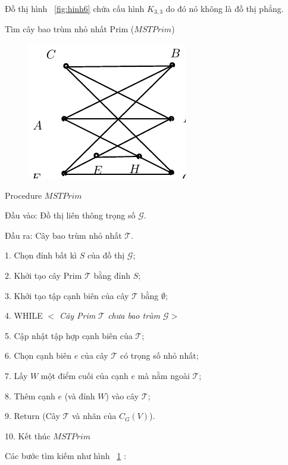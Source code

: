 \documentclass[11pt]{article}
\begin{document}
\begin{shortanswer}[title={\relax}, rearrange=no]
\begin{question}
\begin{answer}
Đồ thị hình ~\ref{fig:hinh6} chứa cấu hình $K_{3,3}$ do đó nó không là đồ thị phẳng.
\end{answer}
\end{question}

\begin{question}%
\begin{answer}
Tìm cây bao trùm nhỏ nhất Prim ($MSTPrim$)

\begin{figure}[!ht]
\centering
\includegraphics[scale =1]{dothiphang2}
\caption{}\label{fig:hinh8}
\end{figure}

Procedure $MSTPrim$

Đầu vào: Đồ thị liên thông trọng số $\mathcal G$. 

Đầu ra:  Cây bao trùm nhỏ nhất $\mathcal T$.

 1. Chọn đỉnh bất kì $S$ của đồ thị $\mathcal G$;

 2. Khởi tạo  cây Prim  $\mathcal T$ bằng đỉnh  $S$;

 3.  Khởi tạo tập cạnh biên của cây $\mathcal T$ bằng  $\emptyset$;

 4. WHILE {{\it $<$ Cây Prim $\mathcal T$ chưa bao trùm  $\mathcal G>$}}

5.  Cập nhật tập hợp cạnh biên của $\mathcal T$;

6.  Chọn cạnh biên $e$ của cây $\mathcal  T$ có trọng số nhỏ nhất;

7.  Lấy $W$ một điểm cuối của cạnh $e$ mà nằm ngoài $\mathcal T$;

8. Thêm cạnh $e$ (và đỉnh $W$) vào cây $\mathcal  T$;

9. Return (Cây $\mathcal  T$ và nhãn của $C_G(V)$).

10. Kết thúc $MSTPrim$

Các bước tìm kiếm như hình ~\ref{fig:hinh8} :
\end{answer}
\end{question}
\end{shortanswer}
\end{document}
